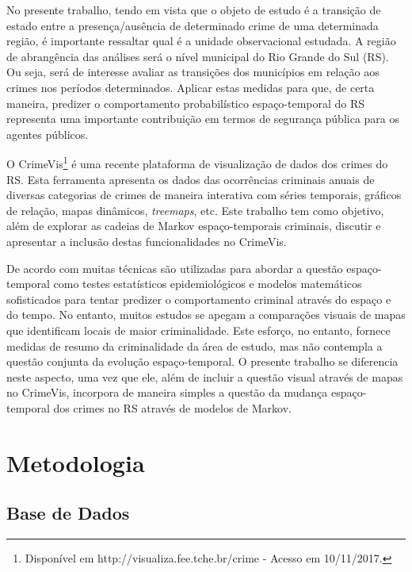 \documentclass[12pt,openright,oneside,a4paper,english,french,spanish]{abntex2}
\numberwithin{table}{section} %
\numberwithin{figure}{section} %
\newcommand{\co}{\citeonline}
\begin{document}
No presente trabalho, tendo em vista que o objeto de estudo é a transição de estado entre a presença/ausência de determinado crime de uma determinada região, é importante ressaltar qual é a unidade observacional estudada. A região de abrangência das análises será o nível municipal do Rio Grande do Sul (RS). Ou seja, será de interesse avaliar as transições dos municípios em relação aos crimes nos períodos determinados. Aplicar estas medidas para que, de certa maneira, predizer o comportamento probabilístico espaço-temporal do RS representa uma importante contribuição em termos de segurança pública para os agentes públicos. 

O CrimeVis\footnote{Disponível em http://visualiza.fee.tche.br/crime - Acesso em 10/11/2017.} \cite{renan2017crimevis} é uma recente plataforma de visualização de dados dos crimes do RS. Esta ferramenta apresenta os dados das ocorrências criminais anuais de diversas categorias de crimes de maneira interativa com séries temporais, gráficos de relação, mapas dinâmicos, \textit{treemaps}, etc. Este trabalho tem como objetivo, além de explorar as cadeias de Markov espaço-temporais criminais, discutir e apresentar a inclusão destas funcionalidades no CrimeVis.

De acordo com \co{rey2012exploratory} muitas técnicas são utilizadas para abordar a questão espaço-temporal como testes estatísticos epidemiológicos e modelos matemáticos sofisticados para tentar predizer o comportamento criminal através do espaço e do tempo. No entanto, muitos estudos se apegam a comparações visuais de mapas que identificam locais de maior criminalidade. Este esforço, no entanto, fornece medidas de resumo da criminalidade da área de estudo, mas não contempla a questão conjunta da evolução espaço-temporal. O presente trabalho se diferencia neste aspecto, uma vez que ele, além de incluir a questão visual através de mapas no CrimeVis, incorpora de maneira simples a questão da mudança espaço-temporal dos crimes no RS através de modelos de Markov.

\section{Metodologia\label{sec:metodologia_acoplamento}}

\subsection{Base de Dados\label{sec:base_de_dados_acoplamento}}
\end{document}
